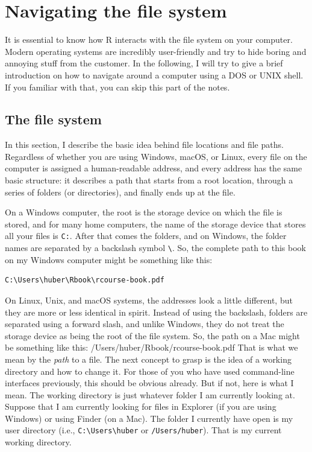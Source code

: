 \documentclass[
  12pt,
  oneside]{book}
\theoremstyle{definition}
\theoremstyle{definition}
\theoremstyle{definition}
\theoremstyle{definition}
\theoremstyle{remark}
\begin{document}
\hypertarget{sec:navigation}{%
\section{Navigating the file system}\label{sec:navigation}}

It is essential to know how R interacts with the file system on your computer. Modern operating systems are incredibly user-friendly and try to hide boring and annoying stuff from the customer. In the following, I will try to give a brief introduction on how to navigate around a computer using a DOS or UNIX shell. If you familiar with that, you can skip this part of the notes.

\hypertarget{sec:filesystem}{%
\subsection{The file system}\label{sec:filesystem}}

In this section, I describe the basic idea behind file locations and file paths. Regardless of whether you are using Windows, macOS, or Linux, every file on the computer is assigned a human-readable address, and every address has the same basic structure: it describes a path that starts from a root location, through a series of folders (or directories), and finally ends up at the file.

On a Windows computer, the root is the storage device on which the file is stored, and for many home computers, the name of the storage device that stores all your files is \texttt{C:}. After that comes the folders, and on Windows, the folder names are separated by a backslash symbol \texttt{\textbackslash{}}. So, the complete path to this book on my Windows computer might be something like this:

\begin{verbatim}
C:\Users\huber\Rbook\rcourse-book.pdf
\end{verbatim}

On Linux, Unix, and macOS systems, the addresses look a little different, but they are more or less identical in spirit. Instead of using the backslash, folders are separated using a forward slash, and unlike Windows, they do not treat the storage device as being the root of the file system. So, the path on a Mac might be something like this:
/Users/huber/Rbook/rcourse-book.pdf
That is what we mean by the \emph{path} to a file. The next concept to grasp is the idea of a working directory and how to change it. For those of you who have used command-line interfaces previously, this should be obvious already. But if not, here is what I mean. The working directory is just whatever folder I am currently looking at. Suppose that I am currently looking for files in Explorer (if you are using Windows) or using Finder (on a Mac). The folder I currently have open is my user directory (i.e., \texttt{C:\textbackslash{}Users\textbackslash{}huber} or \texttt{/Users/huber}). That is my current working directory.
\end{document}
